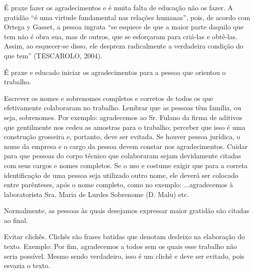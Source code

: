 \begin{agradecimentos}

É praxe fazer os agradecimentos e é muita falta de educação não os fazer. A gratidão “é uma virtude fundamental nas relações humanas”, pois, de acordo com Ortega y Gasset, a pessoa ingrata “se esquece de que a maior parte daquilo que tem não é obra sua, mas de outros, que se esforçaram para criá-las e obtê-las. Assim, ao esquecer-se disso, ele despreza radicalmente a verdadeira condição do que tem” (TESCAROLO, 2004).

É praxe e educado iniciar os agradecimentos para a pessoa que orientou o trabalho.

Escrever os nomes e sobrenomes completos e corretos de todos os que efetivamente colaboraram no trabalho. Lembrar que as pessoas têm família, ou seja, sobrenomes. Por exemplo: agradecemos ao Sr. Fulano da firma de aditivos que gentilmente nos cedeu as amostras para o trabalho; perceber que isso é uma construção grosseira e, portanto, deve ser evitada. Se houver pessoa jurídica, o nome da empresa e o cargo da pessoa devem constar nos agradecimentos. Cuidar para que pessoas do corpo técnico que colaboraram sejam devidamente citadas com seus cargos e nomes completos. Se o uso e costume exigir que para a correta identificação de uma pessoa seja utilizado outro nome, ele deverá ser colocado entre parênteses, após o nome completo, como no exemplo: ...agradecemos à laboratorista Sra. Maria de Lurdes Sobrenome (D. Malu) etc.

Normalmente, as pessoas às quais desejamos expressar maior gratidão são citadas ao final.

Evitar clichês. Clichês são frases batidas que denotam desleixo na elaboração do texto. Exemplo: Por fim, agradecemos a todos sem os quais esse trabalho não seria possível. Mesmo sendo verdadeiro, isso é um clichê e deve ser evitado, pois esvazia o texto.


\end{agradecimentos}